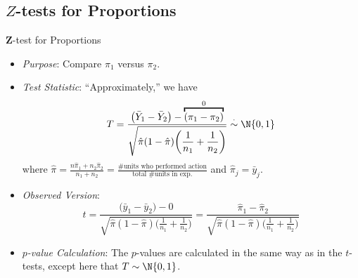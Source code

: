 \subsection{\texorpdfstring{$ Z $}{Z}-tests for Proportions}
\begin{Statistical_Test}{$ \symbf{Z} $-test for Proportions}{}
    \begin{itemize}
        \item \emph{Purpose}: Compare $ \pi_1 $ versus $ \pi_2 $.
        \item \emph{Test Statistic}: ``Approximately,'' we have
              \[ T=\frac{\bigl(\bar{Y}_1-\bar{Y}_2\bigr)-
                      \overbracket{(\pi_1-\pi_2)}^0}{\displaystyle \sqrt{\hat{\pi}(1-\hat{\pi})\biggl(\frac{1}{n_1} +\frac{1}{n_2} \biggr)}}\stackrel{\cdot}{\sim}\N{0,1} \]
              where $ \displaystyle \hat{\pi}=\frac{n\hat{\pi}_1+n_2\hat{\pi}_2}{n_1+n_2}=\frac{\text{\# units who performed action}}{\text{total \# units in exp.}} $
              and $ \hat{\pi}_j=\bar{y}_j $.
        \item \emph{Observed Version}:
              \[ t=\frac{\bigl(\bar{y}_1-\bar{y}_2\bigr)-0}{\displaystyle \sqrt{\hat{\pi}(1-\hat{\pi})\biggl(\frac{1}{n_1} +\frac{1}{n_2} \biggr)}}=
                  \frac{\hat{\pi}_1-\hat{\pi}_2}{\displaystyle \sqrt{\hat{\pi}(1-\hat{\pi})\biggl(\frac{1}{n_1} +\frac{1}{n_2} \biggr)}}\]
        \item \emph{$ p $-value Calculation}: The $ p $-values are calculated
              in the same way as in the $ t $-tests, except here that $ T \sim \N{0,1} $.
    \end{itemize}
\end{Statistical_Test}
